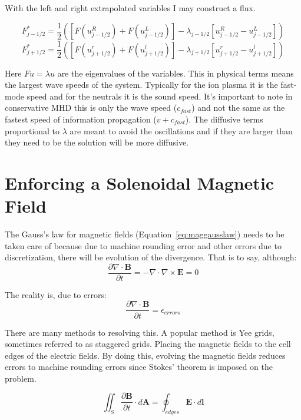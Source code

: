 \documentclass[12pt,upcase]{umlthesis}
\begin{document}
With the left and right extrapolated variables I may construct a flux.

\begin{equation}
	F^*_{j-1/2} = \frac{1}{2} ([F(u^R_{j-1/2})+F(u^L_{j-1/2})] - \lambda_{j-1/2}[u^R_{j-1/2}-u^L_{j-1/2}])
\end{equation}
\begin{equation}
	F^*_{j+1/2} = \frac{1}{2} ([F(u^r_{j+1/2})+F(u^l_{j+1/2})] - \lambda_{j+1/2}[u^r_{j+1/2}-u^l_{j+1/2}])
\end{equation}

Here $F u = \lambda u$ are the eigenvalues of the variables. This in physical terms means the largest wave speeds of the system. Typically for the ion plasma it is the fast-mode speed and for the neutrals it is the sound speed. It's important to note in conservative MHD this is only the wave speed ($c_{fast}$) and not the same as the fastest speed of information propagation ($v+c_{fast}$). The diffusive terms proportional to $\lambda$ are meant to avoid the oscillations and if they are larger than they need to be the solution will be more diffusive.


\section{Enforcing a Solenoidal Magnetic Field}\label{sec:divergencefree}

The Gauss's law for magnetic fields (Equation~\ref{eq:maggausslaw}) needs to be taken care of because due to machine rounding error and other errors due to discretization, there will be evolution of the divergence. That is to say, although:
\begin{equation}
	\frac{\partial\nabla\cdot\textbf{B}}{\partial t} = -\nabla\cdot\nabla\times\textbf{E} = 0
\end{equation}

The reality is, due to errors:
\begin{equation}
	\frac{\partial\nabla\cdot\textbf{B}}{\partial t} = \epsilon_{errors}
\end{equation}

There are many methods to resolving this. A popular method is Yee grids, sometimes referred to as staggered grids. Placing the magnetic fields to the cell edges of the electric fields. By doing this, evolving the magnetic fields reduces errors to machine rounding errors since Stokes' theorem is imposed on the problem.

\begin{equation}\label{eq:stokesyee}
	\iint_S\frac{\partial\textbf{B}}{\partial t}\cdot d\textbf{A} = {\oint}_{edges} \textbf{E}\cdot d\textbf{l}
\end{equation}
\end{document}
